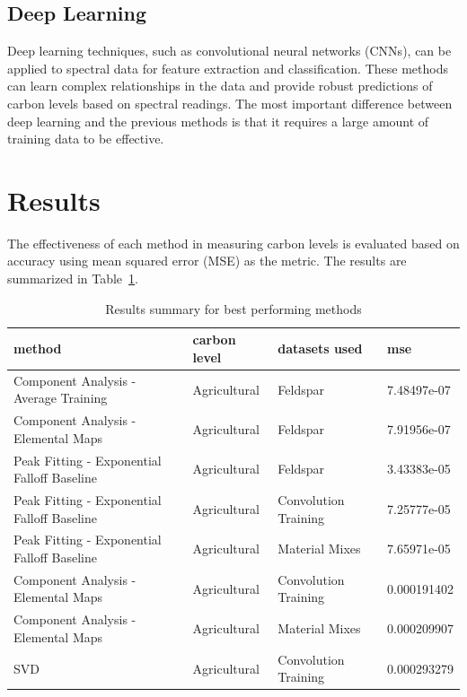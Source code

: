 \documentclass[review]{elsarticle}
\begin{document}
\subsection{Deep Learning}

Deep learning techniques, such as convolutional neural networks (CNNs), can be applied to spectral data for feature extraction and classification. These methods can learn complex relationships in the data and provide robust predictions of carbon levels based on spectral readings. The most important difference between deep learning and the previous methods is that it requires a large amount of training data to be effective.

\section{Results}

The effectiveness of each method in measuring carbon levels is evaluated based on accuracy using mean squared error (MSE) as the metric. The results are summarized in Table~\ref{tab:results_summary}.

\begin{table}[H]
\centering
\caption{Results summary for best performing methods}
\label{tab:results_summary}
\begin{tabular}{@{}llll@{}}
\toprule
method & carbon level & datasets used & mse \\
\midrule
Component Analysis - Average Training & Agricultural & Feldspar & 7.48497e-07 \\
Component Analysis - Elemental Maps & Agricultural & Feldspar & 7.91956e-07 \\
Peak Fitting - Exponential Falloff Baseline & Agricultural & Feldspar & 3.43383e-05 \\
Peak Fitting - Exponential Falloff Baseline & Agricultural & Convolution Training & 7.25777e-05 \\
Peak Fitting - Exponential Falloff Baseline & Agricultural & Material Mixes & 7.65971e-05 \\
Component Analysis - Elemental Maps & Agricultural & Convolution Training & 0.000191402 \\
Component Analysis - Elemental Maps & Agricultural & Material Mixes & 0.000209907 \\
SVD & Agricultural & Convolution Training & 0.000293279 \\
\bottomrule
\end{tabular}
\end{table}
\end{document}
